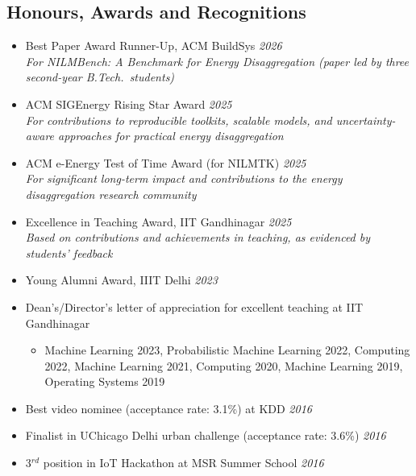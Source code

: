 \documentclass[letter,10pt]{article}
\begin{document}
\subsection*{\textbf{Honours, Awards and Recognitions}}
\vspace{-0.4em}
\begin{itemize}
\item[]{Best Paper Award Runner-Up, ACM BuildSys} \hfill\textit{2026}\\
    \textit{For NILMBench: A Benchmark for Energy Disaggregation (paper led by three second-year B.Tech.\ students)}

\item[]{ACM SIGEnergy Rising Star Award} \hfill\textit{2025}\\
    \textit{For contributions to reproducible toolkits, scalable models, and uncertainty-aware approaches for practical energy disaggregation}

\item[]{ACM e-Energy Test of Time Award (for NILMTK)} \hfill\textit{2025}\\
    \textit{For significant long-term impact and contributions to the energy disaggregation research community}
    
\item[]{Excellence in Teaching Award, IIT Gandhinagar} \hfill\textit{2025}\\
    \textit{Based on contributions and achievements in teaching, as evidenced by students' feedback}

\item[]{Young Alumni Award, IIIT Delhi} \hfill\textit{2023}

    \item[] Dean's/Director's letter of appreciation for excellent teaching at IIT Gandhinagar
    \begin{itemize}
        \item[] Machine Learning 2023, Probabilistic Machine Learning 2022, Computing 2022, Machine Learning 2021, Computing 2020, Machine Learning 2019, Operating Systems 2019
    \end{itemize}
    \item[]{Best video nominee (acceptance rate: 3.1\%)} at KDD \hfill\textit{2016}
    \item[]{Finalist in UChicago Delhi urban challenge (acceptance rate: 3.6\%)} \hfill\textit{2016}
    \item[]{3$^{rd}$ position in IoT Hackathon at MSR Summer School} \hfill\textit{2016}
    

\end{itemize}
\end{document}
